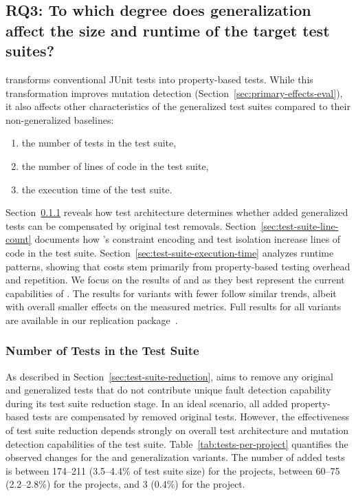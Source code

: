 \subsection{RQ3: To which degree does generalization affect the size and runtime of the target test suites?}
\label{sec:ancillary-effects-eval}

\ToolTeralizer{} transforms conventional JUnit tests into property-based \ToolJqwik{} tests.
While this transformation improves mutation detection (Section~\ref{sec:primary-effects-eval}),
it also affects other characteristics of the generalized test suites compared to their non-generalized baselines:

\begin{enumerate}
  \item the number of tests in the test suite,
  \item the number of lines of code in the test suite,
  \item the execution time of the test suite.
\end{enumerate}

Section~\ref{sec:test-suite-test-count} reveals how test architecture determines
whether added generalized tests can be compensated by original test removals.
Section~\ref{sec:test-suite-line-count} documents
how \ToolTeralizer{}'s constraint encoding and test isolation increase lines of code in the test suite.
Section~\ref{sec:test-suite-execution-time} analyzes runtime patterns,
showing that costs stem primarily from property-based testing overhead and \tries{} repetition.
We focus on the results
of \VariantNaiveC{} and \VariantImprovedC{}
as they best represent the current capabilities of \ToolTeralizer{}.
The results for variants with fewer \tries{} follow similar trends,
albeit with overall smaller effects
on the measured metrics.
Full results for all variants
are available in our replication package~\cite{replicationpackage}.

\subsubsection{Number of Tests in the Test Suite}
\label{sec:test-suite-test-count}

As described in Section~\ref{sec:test-suite-reduction},
\ToolTeralizer{} aims to remove any original and generalized tests
that do not contribute unique fault detection capability
during its test suite reduction stage.
In an ideal scenario, all added property-based tests
are compensated by removed original tests.
However, the effectiveness of test suite reduction
depends strongly on overall test architecture
and mutation detection capabilities of the \VariantOriginal{} test suite.
Table~\ref{tab:tests-per-project} quantifies the observed changes
for the \VariantNaiveC{} and \VariantImprovedC{} generalization variants.
The number of added tests is between 174--211
(3.5--4.4\% of \VariantOriginal{} test suite size)
for the \DatasetsEqBenchEs{} projects,
between 60--75 (2.2--2.8\%)
for the \DatasetsCommonsEs{} projects,
and 3 (0.4\%) for the \DatasetCommonsDev{} project.

